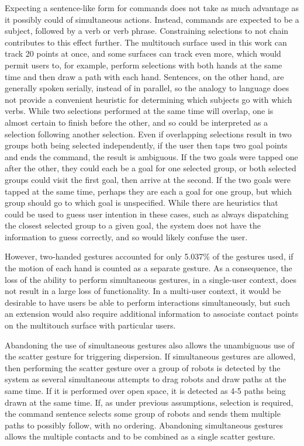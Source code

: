 Expecting a sentence-like form for commands does not take as much advantage as it possibly could of simultaneous actions. 
Instead, commands are expected to be a subject, followed by a verb or verb phrase. 
Constraining selections to not chain contributes to this effect further. 
The multitouch surface used in this work can track 20 points at once, and some surfaces can track even more, which would permit users to, for example, perform selections with both hands at the same time and then draw a path with each hand. 
Sentences, on the other hand, are generally spoken serially, instead of in parallel, so the analogy to language does not provide a convenient heuristic for determining which subjects go with which verbs.
While two selections performed at the same time will overlap, one is almost certain to finish before the other, and so could be interpreted as a selection following another selection. 
Even if overlapping selections result in two groups both being selected independently, if the user then taps two goal points and ends the command, the result is ambiguous. 
If the two goals were tapped one after the other, they could each be a goal for one selected group, or both selected groups could visit the first goal, then arrive at the second. 
If the two goals were tapped at the same time, perhaps they are each a goal for one group, but which group should go to which goal is unspecified.  
While there are heuristics that could be used to guess user intention in these cases, such as always dispatching the closest selected group to a given goal, the system does not have the information to guess correctly, and so would likely confuse the user. 

However, two-handed gestures accounted for only 5.037\% of the gestures used, if the motion of each hand is counted as a separate gesture. 
As a consequence, the loss of the ability to perform simultaneous gestures, in a single-user context, does not result in a large loss of functionality.
In a multi-user context, it would be desirable to have users be able to perform interactions simultaneously, but such an extension would also require additional information to associate contact points on the multitouch surface with particular users. 

Abandoning the use of simultaneous gestures also allows the unambiguous use of the scatter gesture for triggering dispersion. 
If simultaneous gestures are allowed, then performing the scatter gesture over a group of robots is detected by the system as several simultaneous attempts to drag robots and draw paths at the same time. 
If it is performed over open space, it is detected as 4-5 paths being drawn at the same time. 
If, as under previous assumptions, selection is required, the command sentence selects some group of robots and sends them multiple paths to possibly follow, with no ordering. 
Abandoning simultaneous gestures allows the multiple contacts and to be combined as a single scatter gesture. 


